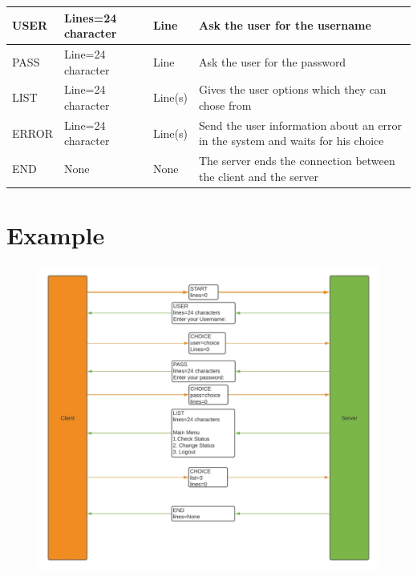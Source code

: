 \documentclass[11pt]{article}
\begin{document}
\begin{table}[H]
{\begin{tabular}{llll}
						\multicolumn{1}{|l|}{USER}                         & \multicolumn{1}{l|}{Lines=24 character}         & \multicolumn{1}{l|}{Line}    & \multicolumn{1}{l|}{Ask the user for the username}                                                          \\ \hline
						\multicolumn{1}{|l|}{PASS}                         & \multicolumn{1}{l|}{Line=24 character}          & \multicolumn{1}{l|}{Line}    & \multicolumn{1}{l|}{Ask the user for the password}                                                          \\ \hline
						\multicolumn{1}{|l|}{LIST}                         & \multicolumn{1}{l|}{Line=24 character}          & \multicolumn{1}{l|}{Line(s)} & \multicolumn{1}{l|}{Gives the user options which they can chose from}                                       \\ \hline
						\multicolumn{1}{|l|}{ERROR}                        & \multicolumn{1}{l|}{Line=24 character}          & \multicolumn{1}{l|}{Line(s)} & \multicolumn{1}{l|}{Send the user information about an error in the system and waits for his choice}        \\ \hline
						\multicolumn{1}{|l|}{END}                          & \multicolumn{1}{l|}{None}                       & \multicolumn{1}{l|}{None}    & \multicolumn{1}{l|}{The server ends the connection between the client and the server}                       \\ \hline
					\end{tabular}
				}
			\end{table}
	\section{Example}
		\begin{figure}[H]
			\centering
			\includegraphics[scale=0.5]{Examples}
			\label{fig:examples}
		\end{figure}
\end{document}

